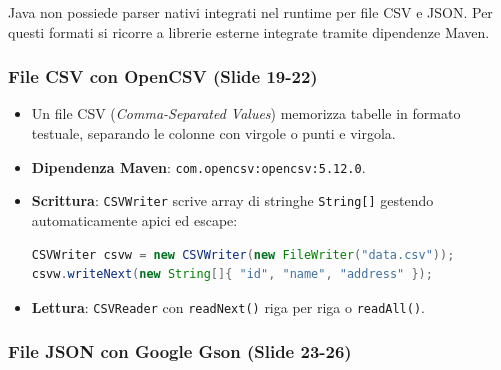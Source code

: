 \documentclass[11pt,a4paper,oneside]{report}
\newcommand{\passthrough}[1]{#1}
\begin{document}
Java non possiede parser nativi integrati nel runtime per file CSV e
JSON. Per questi formati si ricorre a librerie esterne integrate tramite
dipendenze Maven.

\subsubsection{File CSV con OpenCSV (Slide
19-22)}\label{chap19_file-csv-con-opencsv-slide-19-22}

\begin{itemize}
\item
  Un file CSV (\emph{Comma-Separated Values}) memorizza tabelle in
  formato testuale, separando le colonne con virgole o punti e virgola.
\item
  \textbf{Dipendenza Maven}:
  \passthrough{\lstinline!com.opencsv:opencsv:5.12.0!}.
\item
  \textbf{Scrittura}: \passthrough{\lstinline!CSVWriter!} scrive array
  di stringhe \passthrough{\lstinline!String[]!} gestendo
  automaticamente apici ed escape:

\begin{lstlisting}[language=Java]
CSVWriter csvw = new CSVWriter(new FileWriter("data.csv"));
csvw.writeNext(new String[]{ "id", "name", "address" });
\end{lstlisting}
\item
  \textbf{Lettura}: \passthrough{\lstinline!CSVReader!} con
  \passthrough{\lstinline!readNext()!} riga per riga o
  \passthrough{\lstinline!readAll()!}.
\end{itemize}

\subsubsection{File JSON con Google Gson (Slide
23-26)}\label{chap19_file-json-con-google-gson-slide-23-26}
\end{document}
